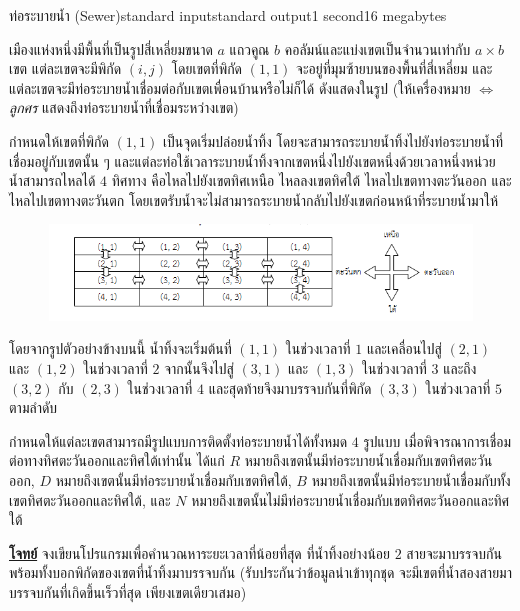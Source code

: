 \documentclass[11pt,a4paper]{article}
\begin{document}
\begin{problem}{ท่อระบายน้ำ (Sewer)}{standard input}{standard output}{1 second}{16 megabytes}

เมืองแห่งหนึ่งมีพื้นที่เป็นรูปสี่เหลี่ยมขนาด $a$ แถวคูณ $b$ คอลัมน์และแบ่งเขตเป็นจำนวนเท่ากับ $a \times b$ เขต แต่ละเขตจะมีพิกัด $(i, j)$ โดยเขตที่พิกัด $(1, 1)$ จะอยู่ที่มุมซ้ายบนของพื้นที่สี่เหลี่ยม และแต่ละเขตจะมีท่อระบายน้ำเชื่อมต่อกับเขตเพื่อนบ้านหรือไม่ก็ได้ ดังแสดงในรูป (ให้เครื่องหมาย \textit{$\Leftrightarrow$ ลูกศร} แสดงถึงท่อระบายน้ำที่เชื่อมระหว่างเขต)


กำหนดให้เขตที่พิกัด $(1, 1)$ เป็นจุดเริ่มปล่อยน้ำทิ้ง โดยจะสามารถระบายน้ำทิ้งไปยังท่อระบายน้ำที่เชื่อมอยู่กับเขตนั้น ๆ และแต่ละท่อใช้เวลาระบายน้ำทิ้งจากเขตหนึ่งไปยังเขตหนึ่งด้วยเวลาหนึ่งหน่วย น้ำสามารถไหลได้ $4$ ทิศทาง คือไหลไปยังเขตทิศเหนือ ไหลลงเขตทิศใต้ ไหลไปเขตทางตะวันออก และ ไหลไปเขตทางตะวันตก โดยเขตรับน้ำจะไม่สามารถระบายน้ำกลับไปยังเขตก่อนหน้าที่ระบายน้ำมาให้

\begin{figure}[!h]
\centering
\includegraphics[width=1\textwidth]{../latex/img/1161/1161-1.png}
\end{figure}


โดยจากรูปตัวอย่างข้างบนนี้ น้ำทิ้งจะเริ่มต้นที่ $(1, 1)$ ในช่วงเวลาที่ $1$ และเคลื่อนไปสู่ $(2, 1)$ และ $(1, 2)$ ในช่วงเวลาที่ $2$ จากนั้นจึงไปสู่ $(3, 1)$ และ $(1, 3)$ ในช่วงเวลาที่ $3$ และถึง $(3, 2)$ กับ $(2, 3)$ ในช่วงเวลาที่ $4$ และสุดท้ายจึงมาบรรจบกันที่พิกัด $(3, 3)$ ในช่วงเวลาที่ $5$ ตามลำดับ

กำหนดให้แต่ละเขตสามารถมีรูปแบบการติดตั้งท่อระบายน้ำได้ทั้งหมด $4$ รูปแบบ เมื่อพิจารณาการเชื่อมต่อทางทิศตะวันออกและทิศใต้เท่านั้น ได้แก่ $R$ หมายถึงเขตนั้นมีท่อระบายน้ำเชื่อมกับเขตทิศตะวันออก, $D$ หมายถึงเขตนั้นมีท่อระบายน้ำเชื่อมกับเขตทิศใต้, $B$ หมายถึงเขตนั้นมีท่อระบายน้ำเชื่อมกับทั้งเขตทิศตะวันออกและทิศใต้, และ $N$ หมายถึงเขตนั้นไม่มีท่อระบายน้ำเชื่อมกับเขตทิศตะวันออกและทิศใต้

\bigskip
\underline{\textbf{โจทย์}}  จงเขียนโปรแกรมเพื่อคำนวณหาระยะเวลาที่น้อยที่สุด ที่น้ำทิ้งอย่างน้อย $2$ สายจะมาบรรจบกัน พร้อมทั้งบอกพิกัดของเขตที่น้ำทิ้งมาบรรจบกัน (รับประกันว่าข้อมูลนำเข้าทุกชุด จะมีเขตที่น้ำสองสายมาบรรจบกันที่เกิดขึ้นเร็วที่สุด เพียงเขตเดียวเสมอ) 



\end{problem}
\end{document}
